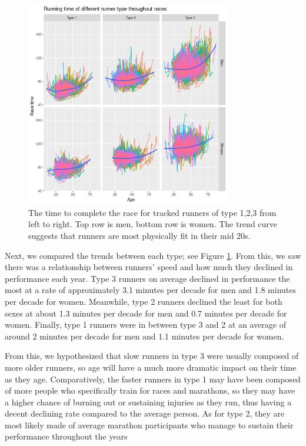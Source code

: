 \documentclass[12pt]{article}
\begin{document}
\begin{figure}[ht]
	\centering
	\includegraphics[width = 0.8\textwidth]
	{../figure/run_type2_gr-1.png}
	\caption{
		The time to complete the race for tracked runners of
		type 1,2,3 from left to right. Top row is men,
		bottom row is women.
		The trend curve suggests that runners are most physically
		fit in their mid 20s.
	}
	\label{type123-trend}
\end{figure}

Next, we compared the trends between each type;
see Figure \ref{type123-trend}.
From this, we saw there was a relationship between runners' speed and how
much they declined in performance each year.
Type 3 runners on average declined in performance the most at a rate
of approximately 3.1 minutes per decade for men and 1.8 minutes per
decade for women.
Meanwhile, type 2 runners declined the least for both sexes at about
1.3 minutes per decade for men and 0.7 minutes per decade for women.
Finally, type 1 runners were in between type 3 and 2 at an average of
around 2 minutes per decade for men and 1.1 minutes per decade for women.

From this, we hypothesized that slow runners in type 3 were usually
composed of more older runners, so age will have a much more dramatic
impact on their time as they age.
Comparatively, the faster runners in type 1 may have been composed of
more people who specifically train for races and marathons,
so they may have a higher chance of burning out or sustaining injuries
as they run, thus having a decent declining rate compared to the
average person.
As for type 2, they are most likely made of average marathon
participants who %
manage to sustain their performance throughout the years
\end{document}
